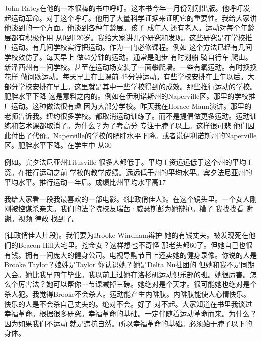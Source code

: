 John Ratey在他的一本很棒的书中呼吁。这本书今年一月份刚刚出版。他呼吁发起运动革命。对于这个呼吁。他用了大量科学证据来证明它的重要性。我给大家讲他谈到的一个方面。他谈到各种年龄层。孩子 成年人 还有老人。运动对每个年龄层都有积极作用 从0到120岁。我给大家讲几个研究和发现。这些研究是在学校推广运动。有几间学校实行把运动。作为一门必修课程。例如 这个方法已经有几间学校效仿了。每天早上 做45分钟的运动。通常是跑步 有时划船 骑自行车 爬山。新泽西州有一间学校。甚至在运动场安装了一面攀爬墙。一些有氧运动。有时换换花样 做间歇运动。每天早上在上课前 45分钟运动。有些学校安排在上午以后。大部分学校安排在早上。这里就是其中一些学校得到的成效。那些推行运动的学校。肥胖水平下降 这是意料之内的。例如在伊利诺斯州的Naperville区。那里的学校推广运动。这种做法很有趣 因为大部分学校。昨天我在Horace Mann演讲。那里的老师告诉我。纽约很多学校。都取消运动训练了。而不是提倡做更多运动。运动训练和艺术课都取消了。为什么？为了考高分 专注于脖子以上。这样很可悲 他们因此付出了代价。Naperville的学校的肥胖水平下降。或者说伊利诺斯州的Naperville区。肥胖水平下降。在学生中 从30%

例如。宾夕法尼亚州Titusville 很多人都低于。平均工资远远低于这个州的平均工资。在推行运动之前 学校的教学成绩。远远低于州的平均水平。宾夕法尼亚州的平均水平。推行运动一年后。成绩比州平均水平高17%

我给大家看一段我最喜欢的一部电影。《律政俏佳人》。在这个镜头里。一个女人刚刚被控谋杀亲夫。我们的法学院校友瑞茜·威瑟斯彭为她辩护。糟了 我找找看 谢谢。视频 律政 找到了。 

(律政俏佳人片段)。我们要为Brooke Windham辩护 她的有钱丈夫。被发现死在他们的Beacon Hill大宅里。挖金女？这样想也不奇怪 那老头都60了。但她自己也很有钱。拥有一间庞大的健身公司。电视导购节目上还卖她的健身录像。你说的人是Brooke Taylor？娘姓是Taylor 你认识她？她是Delta Nu社团的 但她和我不是同期入会。她比我早四年毕业。我以前上过她在洛杉矶运动俱乐部的班。她很厉害。怎么个厉害法？她可以帮你一节课减掉三磅。她绝对是个天才。很可能她也绝对是个杀人犯。我觉得Brooke不会杀人。运动能产生内啡肽。内啡肽能使人心情快乐。快乐的人是不会杀自己丈夫的。绝对不会。好了 对不起。大家知道在书里我谈过幸福革命。根据很多研究。幸福革命的基础。一定伴随着运动革命而来。为什么？因为如果我们不运动 就是违抗自然。所以幸福革命的基础。必须始于脖子以下的身体。 

